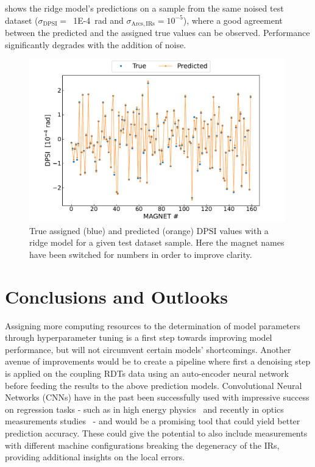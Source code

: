  shows the ridge model's predictions on a sample from the same noised test dataset (\(\sigma_{\mathrm{DPSI}} =\)~\qty{1E-4}{\radian} and \(\sigma_{\mathrm{Arcs, IRs}} = 10^{-5}\)), where a good agreement between the predicted and the assigned true values can be observed.
Performance significantly degrades with the addition of noise.

\begin{figure}[!htb]
    \centering
    \includegraphics*[width=0.99\textwidth]{Figures/ML_for_IR_Coupling/ml_ridge_regression_sample_predictions.pdf}
    \caption{True assigned (\textcolor{mplblue}{blue}) and predicted (\textcolor{mplorange}{orange}) \(\mathrm{DPSI}\) values with a ridge model for a given test dataset sample. Here the magnet names have been switched for numbers in order to improve clarity.}
    \label{figure:ridge_predictions}
\end{figure}

\section{Conclusions and Outlooks}

Assigning more computing resources to the determination of model parameters through hyperparameter tuning is a first step towards improving model performance, but will not circumvent certain models' shortcomings.
Another avenue of improvements would be to create a pipeline where first a denoising step is applied on the coupling RDTs data using an auto-encoder neural network~\cite{folDenoisingOpticsMeasurements2021} before feeding the results to the above prediction models.
Convolutional Neural Networks (CNNs) have in the past been successfully used with impressive success on regression tasks - such as in high energy physics~\cite{JOI:Aurisano:Convolutional_Neural_Network_Neutrino_Event_Classifier} and recently in optics measurements studies~\cite{IPAC:Fol:Optics_Corrections_Using_Machine_Learning_in_the_LHC} - and would be a promising tool that could yield better prediction accuracy.
These could give the potential to also include measurements with different machine configurations breaking the degeneracy of the IRs, providing additional insights on the local errors.

